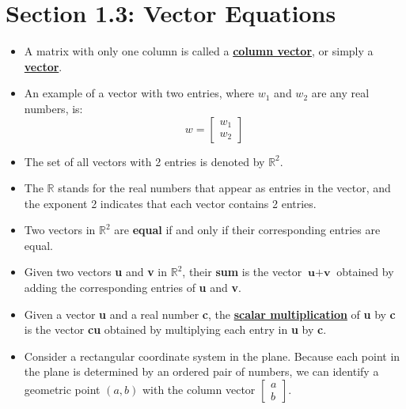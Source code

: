 \documentclass{article}
\newtheorem{theorem}{Theorem}
\newcommand{\definition}[1]{\underline{\textbf{#1}}}
\begin{document}
\section*{Section 1.3: Vector Equations}

\begin{itemize}

  \item A matrix with only one column is called a \definition{column vector}, or simply a \definition{vector}.
  
  \item An example of a vector with two entries, where $w_1$ and $w_2$ are any real numbers, is:
  \begin{equation*}
      w = \begin{bmatrix}
        w_1 \\ w_2
      \end{bmatrix}
  \end{equation*}

  \item The set of all vectors with 2 entries is denoted by $\mathbb{R}^2$.
  
  \item The $\mathbb{R}$ stands for the real numbers that appear as entries in the vector, and the exponent 2 indicates that each vector contains 2 entries.
  
  \item Two vectors in $\mathbb{R}^2$ are \textbf{equal} if and only if their corresponding entries are equal.
  
  \item Given two vectors \textbf{u} and \textbf{v} in $\mathbb{R}^2$, their \textbf{sum} is the vector $\textbf{u} + \textbf{v}$ obtained by adding the corresponding entries of \textbf{u} and \textbf{v}.
  
  \item Given a vector \textbf{u} and a real number \textbf{c}, the \definition{scalar multiplication} of \textbf{u} by \textbf{c} is the vector \textbf{cu} obtained by multiplying each entry in \textbf{u} by \textbf{c}.
  
  \item Consider a rectangular coordinate system in the plane. Because each point in the plane is determined by an ordered pair of numbers, we can identify a geometric point $(a,b)$ with the column vector 
  $\begin{bmatrix}
    a \\ b
  \end{bmatrix}$.

\end{itemize}

\noindent{}
\end{document}
